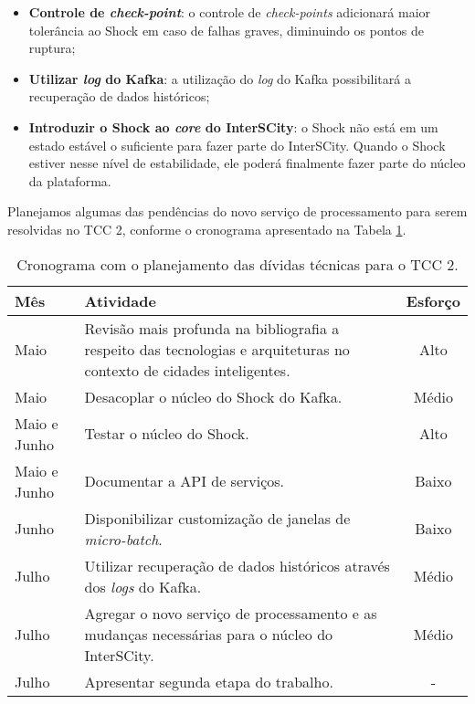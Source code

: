 \begin{itemize}
    \item \textbf{Controle de \textit{check-point}}: o controle de
        \textit{check-points} adicionará maior tolerância ao Shock em caso
        de falhas graves, diminuindo os pontos de ruptura;

    \item \textbf{Utilizar \textit{log} do Kafka}: a utilização do \textit{log}
        do Kafka possibilitará a recuperação de dados históricos;

    \item \textbf{Introduzir o Shock ao \textit{core} do InterSCity}: o Shock
        não está em um estado estável o suficiente para fazer parte do
        InterSCity. Quando o Shock estiver nesse nível de estabilidade, ele
        poderá finalmente fazer parte do núcleo da plataforma.
\end{itemize}

Planejamos algumas das pendências do novo serviço de processamento
para serem resolvidas no TCC 2, conforme o cronograma apresentado na Tabela
\ref{tab:cronograma}.

\begin{table}[h]
  \begin{center}
  \caption{Cronograma com o planejamento das dívidas técnicas para o TCC 2.}
      \label{tab:cronograma}
    \begin{tabular}{|l| p{12cm}|c|}
        \hline \textbf{Mês} & \textbf{Atividade}  & \textbf{Esforço} \\

        \hline Maio & Revisão mais profunda na bibliografia a respeito das
        tecnologias e arquiteturas no contexto de cidades inteligentes. &
        Alto \\

        \hline Maio & Desacoplar o núcleo do Shock do Kafka. & Médio \\

        \hline Maio e Junho & Testar o núcleo do Shock. & Alto \\

        \hline Maio e Junho & Documentar a API de serviços. & Baixo \\

        \hline Junho & Disponibilizar customização de janelas de \textit{micro-batch}. & Baixo \\

        \hline Julho & Utilizar recuperação de dados históricos através dos
        \textit{logs} do Kafka. & Médio \\

        \hline Julho & Agregar o novo serviço de processamento e as mudanças
        necessárias para o núcleo do InterSCity. & Médio \\

        \hline Julho & Apresentar segunda etapa do trabalho. & - \\

      \hline
    \end{tabular}
  \end{center}
\end{table}

